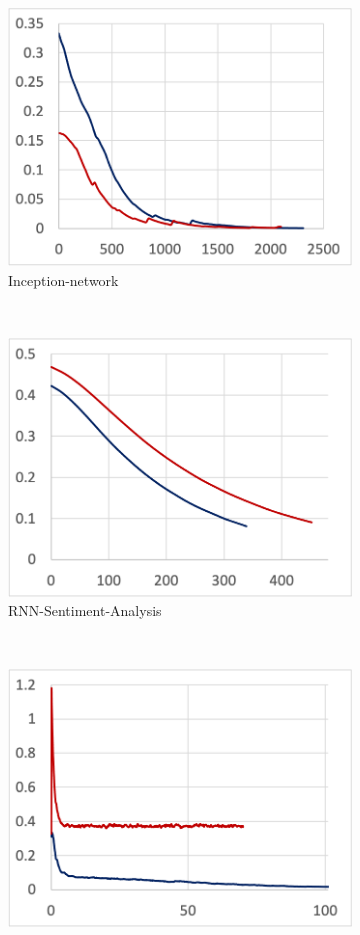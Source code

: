 \begin{figure}
\begin{subfigure}[t]{.24\textwidth}
    \includegraphics[width=\textwidth]{tf2-07}
    \caption{Inception-network}
  \end{subfigure}
  ~
  \begin{subfigure}[t]{.24\textwidth}
    \includegraphics[width=\textwidth]{tf2-09}
    \caption{RNN-Sentiment-Analysis}
  \end{subfigure} 
  ~ 
  \begin{subfigure}[t]{.24\textwidth}
    \includegraphics[width=\textwidth]{tf2-10}

\end{subfigure}
\end{figure}
